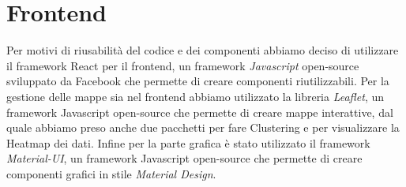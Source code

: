 \documentclass[../../Report.tex]{subfiles}
\begin{document}
\section{Frontend}
    Per  motivi di riusabilità del codice e dei componenti abbiamo deciso di utilizzare il framework React per il frontend, un framework \emph{Javascript} open-source sviluppato da Facebook che permette di creare componenti riutilizzabili. 
    Per la gestione delle mappe sia nel frontend abbiamo utilizzato la libreria \emph{Leaflet}, un framework Javascript open-source che permette di creare mappe interattive, dal quale abbiamo preso anche due pacchetti per fare Clustering e per visualizzare la Heatmap dei dati. Infine per la parte grafica è stato utilizzato il framework \emph{Material-UI}, un framework Javascript open-source che permette di creare componenti grafici in stile \emph{Material Design}.\\
\end{document}
